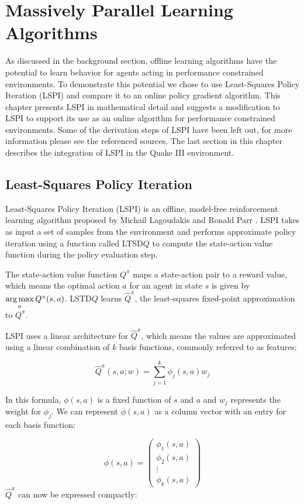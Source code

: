 \chapter{Massively Parallel Learning Algorithms}
\label{chap:implementation}

As discussed in the background section, offline learning algorithms have the potential to learn behavior for agents acting in performance constrained environments. To demonstrate this potential we chose to use Least-Squares Policy Iteration (LSPI) and compare it to an online policy gradient algorithm. This chapter presents LSPI in mathematical detail and suggests a modification to LSPI to support its use as an online algorithm for performance constrained environments. Some of the derivation steps of LSPI have been left out, for more information please see the referenced sources. The last section in this chapter describes the integration of LSPI in the Quake III environment.

\section{Least-Squares Policy Iteration}

Least-Squares Policy Iteration (LSPI) is an offline, model-free reinforcement learning algorithm proposed by Michail Lagoudakis and Ronald Parr \cite{lspi}. LSPI takes as input a set of samples from the environment and performs approximate policy iteration using a function called LTSD$Q$ to compute the state-action value function during the policy evaluation step.

The state-action value function $Q^\pi$ maps a state-action pair to a reward value, which means the optimal action $a$ for an agent in state $s$ is given by $\operatorname*{arg\,max}\limits_a Q^\pi(s,a)$. LSTD$Q$ learns $\hat{Q}^\pi$, the least-squares fixed-point approximation to $Q^\pi$.

LSPI uses a linear architecture for $\hat{Q}^\pi$, which means the values are approximated using a linear combination of $k$ basis functions, commonly referred to as features:

\[
    \hat{Q}^\pi(s,a;w) = \sum_{j=1}^k \phi_j(s,a)w_j
\]

In this formula, $\phi(s,a)$ is a fixed function of $s$ and $a$ and $w_j$ represents the weight for $\phi_j$. We can represent $\phi(s,a)$ as a column vector with an entry for each basis function:

\[
    \phi(s,a) = \begin{pmatrix}
       \phi_1(s,a) \\ \phi_2(s,a) \\ \vdots \\ \phi_k(s,a)
    \end{pmatrix}
\]
$\hat{Q}^\pi$  can now be expressed compactly:

